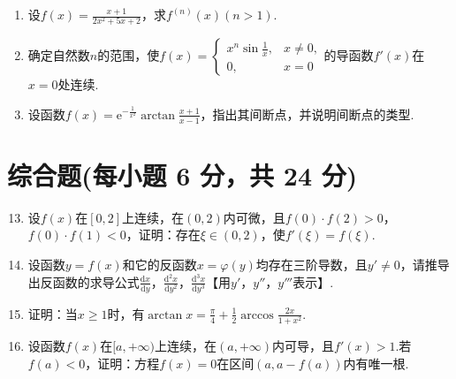 \documentclass[../main.tex]{subfiles}
\begin{document}
\begin{enumerate}
    \item 设$f(x)=\frac{x+1}{2x^{2}+5x+2}$，求$f^{(n)}(x)(n>1)$.
          \vspace{8em}

    \item 确定自然数$n$的范围，使$f(x)=
              \begin{cases}
                  x^{n} \sin\frac{1}{x}, & x\neq0, \\
                  0,                     & x=0
              \end{cases}$的导函数$f'(x)$在$x=0$处连续.
          \vspace{8em}

    \item 设函数$f(x)=\mathrm{e}^{-\frac{1}{x^{2}}}\arctan\frac{x+1}{x-1}$，指出其间断点，并说明间断点的类型.
          \vspace{8em}
\end{enumerate}

\section{综合题(每小题 6 分，共 24 分)}
\begin{enumerate}
    \setcounter{enumi}{12}
    \item 设$f(x)$在$[0,2]$上连续，在$(0,2)$内可微，且$f(0)\cdot f(2)>0$，$f
              (0)\cdot f(1)<0$，证明：存在$\xi\in(0,2)$，使$f'(\xi)=f(\xi)$.
          \vspace{9em}

    \item 设函数$y=f(x)$和它的反函数$x=\varphi(y)$均存在三阶导数，且$y'\neq0$，请推导出反函数的求导公式$\frac{\mathrm{d}x}{\mathrm{d}y}$，$\frac{\mathrm{d}^{2}
                  x}{\mathrm{d}y^{2}}$，$\frac{\mathrm{d}^{3} x}{\mathrm{d}y^{3}}$【用$y'$，$y
              ''$，$y'''$表示】.
          \vspace{9em}

    \item 证明：当$x\geq1$时，有$\arctan x=\frac{\pi}{4}+\frac{1}{2}\arccos\frac{2x}{1+x^{2}}$.
          \vspace{10em}

    \item 设函数$f(x)$在$[a,+\infty)$上连续，在$(a,+\infty)$内可导，且$f'(x)
              >1$.若$f(a)<0$，证明：方程$f(x)=0$在区间$(a,a-f(a))$内有唯一根.
          \vspace{11em}
\end{enumerate}
\end{document}
